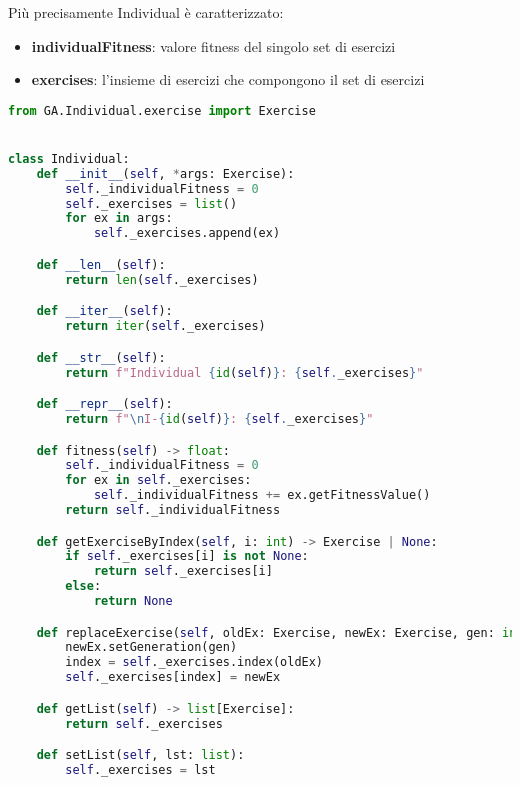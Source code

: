 \documentclass{article}
\begin{document}
Più precisamente Individual è caratterizzato:
\begin{itemize}
\item\textbf{individualFitness}: valore fitness del singolo set di esercizi
\item\textbf{exercises}: l'insieme di esercizi che compongono il set di esercizi
\end{itemize}
\begin{lstlisting}[language=Python, breaklines, no caption]
from GA.Individual.exercise import Exercise


class Individual:
    def __init__(self, *args: Exercise):
        self._individualFitness = 0
        self._exercises = list()
        for ex in args:
            self._exercises.append(ex)

    def __len__(self):
        return len(self._exercises)

    def __iter__(self):
        return iter(self._exercises)

    def __str__(self):
        return f"Individual {id(self)}: {self._exercises}"

    def __repr__(self):
        return f"\nI-{id(self)}: {self._exercises}"

    def fitness(self) -> float:
        self._individualFitness = 0
        for ex in self._exercises:
            self._individualFitness += ex.getFitnessValue()
        return self._individualFitness

    def getExerciseByIndex(self, i: int) -> Exercise | None:
        if self._exercises[i] is not None:
            return self._exercises[i]
        else:
            return None

    def replaceExercise(self, oldEx: Exercise, newEx: Exercise, gen: int):
        newEx.setGeneration(gen)
        index = self._exercises.index(oldEx)
        self._exercises[index] = newEx

    def getList(self) -> list[Exercise]:
        return self._exercises

    def setList(self, lst: list):
        self._exercises = lst
\end{lstlisting}

\pagebreak
\end{document}
